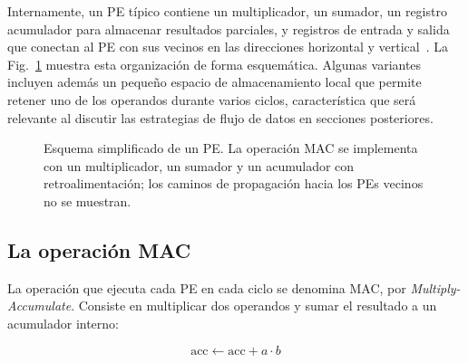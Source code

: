 \documentclass[conference]{IEEEtran}
\begin{document}
Internamente, un PE típico contiene un multiplicador, un sumador, un registro acumulador para almacenar resultados parciales, y registros de entrada y salida que conectan al PE con sus vecinos en las direcciones horizontal y vertical~\cite{liao2025nn}. La Fig.~\ref{fig:pe} muestra esta organización de forma esquemática. Algunas variantes incluyen además un pequeño espacio de almacenamiento local que permite retener uno de los operandos durante varios ciclos, característica que será relevante al discutir las estrategias de flujo de datos en secciones posteriores.

\begin{figure}[t]
\centering
{}
\caption{Esquema simplificado de un PE. La operación MAC se implementa con un multiplicador, un sumador y un acumulador con retroalimentación; los caminos de propagación hacia los PEs vecinos no se muestran.}
\label{fig:pe}
\end{figure}

\subsection{La operación MAC}

La operación que ejecuta cada PE en cada ciclo se denomina MAC, por \textit{Multiply-Accumulate}. Consiste en multiplicar dos operandos y sumar el resultado a un acumulador interno:

\begin{equation}
    \mathrm{acc} \leftarrow \mathrm{acc} + a \cdot b
    \label{eq:MAC}
\end{equation}
\end{document}
